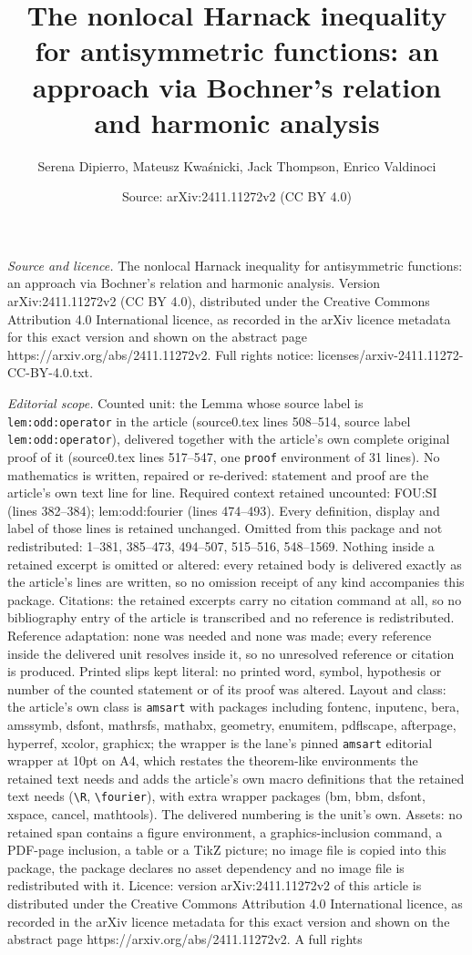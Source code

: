 \documentclass[10pt,a4paper]{amsart}
\title[The nonlocal Harnack inequality for antisymmetric functions:]{The nonlocal Harnack inequality for antisymmetric functions: an approach via Bochner's relation and harmonic analysis}
\author{Serena Dipierro, Mateusz Kwa\'snicki, Jack Thompson, Enrico Valdinoci}
\date{Source: arXiv:2411.11272v2 (CC BY 4.0)}
\begin{document}
\maketitle

\noindent\emph{Source and licence.} The nonlocal Harnack inequality for antisymmetric functions: an approach via Bochner's relation and harmonic analysis. Version arXiv:2411.11272v2 (CC BY 4.0), distributed under the Creative Commons Attribution 4.0 International licence, as recorded in the arXiv licence metadata for this exact version and shown on the abstract page https://arxiv.org/abs/2411.11272v2. Full rights notice: licenses/arxiv-2411.11272-CC-BY-4.0.txt.\par\smallskip

\noindent\textit{Editorial scope.} Counted unit: the Lemma whose source label is \texttt{lem:odd:operator} in the article (source0.tex lines 508--514, source label \texttt{lem:odd:operator}), delivered together with the article's own complete original proof of it (source0.tex lines 517--547, one \texttt{proof} environment of 31 lines). No mathematics is written, repaired or re-derived: statement and proof are the article's own text line for line. Required context retained uncounted: FOU:SI (lines 382--384); lem:odd:fourier (lines 474--493). Every definition, display and label of those lines is retained unchanged. Omitted from this package and not redistributed: 1--381, 385--473, 494--507, 515--516, 548--1569. Nothing inside a retained excerpt is omitted or altered: every retained body is delivered exactly as the article's lines are written, so no omission receipt of any kind accompanies this package. Citations: the retained excerpts carry no citation command at all, so no bibliography entry of the article is transcribed and no reference is redistributed. Reference adaptation: none was needed and none was made; every reference inside the delivered unit resolves inside it, so no unresolved reference or citation is produced. Printed slips kept literal: no printed word, symbol, hypothesis or number of the counted statement or of its proof was altered. Layout and class: the article's own class is \texttt{amsart} with packages including fontenc, inputenc, bera, amssymb, dsfont, mathrsfs, mathabx, geometry, enumitem, pdflscape, afterpage, hyperref, xcolor, graphicx; the wrapper is the lane's pinned \texttt{amsart} editorial wrapper at 10pt on A4, which restates the theorem-like environments the retained text needs and adds the article's own macro definitions that the retained text needs (\texttt{\textbackslash R}, \texttt{\textbackslash fourier}), with extra wrapper packages (bm, bbm, dsfont, xspace, cancel, mathtools). The delivered numbering is the unit's own. Assets: no retained span contains a figure environment, a graphics-inclusion command, a PDF-page inclusion, a table or a TikZ picture; no image file is copied into this package, the package declares no asset dependency and no image file is redistributed with it. Licence: version arXiv:2411.11272v2 of this article is distributed under the Creative Commons Attribution 4.0 International licence, as recorded in the arXiv licence metadata for this exact version and shown on the abstract page https://arxiv.org/abs/2411.11272v2. A full rights 
\end{document}
